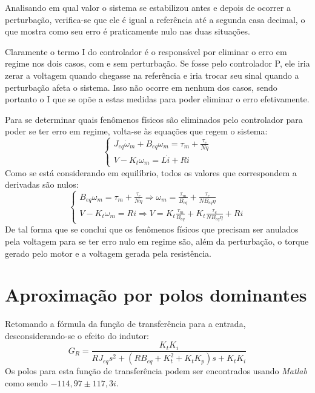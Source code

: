 \documentclass{article}[twocolumn]
\begin{document}
	Analisando em qual valor o sistema se estabilizou antes e depois de ocorrer a
	perturba\c{c}\~ao, verifica-se que ele \'e igual a refer\^encia at\'e a segunda casa
	decimal, o que mostra como seu erro \'e praticamente nulo nas duas situa\c{c}\~oes.

	Claramente o termo I do controlador \'e o respons\'avel por eliminar o erro em regime
	nos dois casos, com e sem perturba\c{c}\~ao. Se fosse pelo controlador P, ele iria zerar
	a voltagem quando chegasse na refer\^encia e iria trocar seu sinal quando a perturba\c{c}\~ao
	afeta o sistema. Isso n\~ao ocorre em nenhum dos casos, sendo portanto o I que se op\~oe
	a estas medidas para poder eliminar o erro efetivamente.

	Para se determinar quais fen\^omenos f\'isicos s\~ao eliminados pelo controlador para
	poder se ter erro em regime, volta-se \`as equa\c{c}\~oes que regem o sistema:
	\begin{equation}
		\left\{\begin{array}{l}
			J_{eq}\dot{\omega}_m + B_{eq}\omega_m = \tau_m + \frac{\tau_e}{N\eta}\\
			V - K_t\omega_m = L\dot{i} + Ri
		\end{array}\right.
		\nonumber
	\end{equation}
	Como se est\'a considerando em equil\'ibrio, todos os valores que correspondem a derivadas
	s\~ao nulos:
	\begin{equation}
		\left\{\begin{array}{l}
			B_{eq}\omega_m = \tau_m + \frac{\tau_e}{N\eta} \Rightarrow \omega_m =
			\frac{\tau_m}{B_{eq}} + \frac{\tau_e}{NB_{eq}\eta}\\
			V - K_t\omega_m = Ri \Rightarrow V =
			K_t\frac{\tau_m}{B_{eq}} + K_t\frac{\tau_e}{NB_{eq}\eta} + Ri
		\end{array}\right.
		\nonumber
	\end{equation}
	De tal forma que se conclui que os fen\^omenos f\'isicos que precisam ser anulados pela
	voltagem para se ter erro nulo em regime s\~ao, al\'em da perturba\c{c}\~ao, o torque
	gerado pelo motor e a voltagem gerada pela resist\^encia.
	\section{Aproxima\c{c}\~ao por polos dominantes}
	Retomando a f\'ormula da fun\c{c}\~ao de transfer\^encia para a entrada, desconsiderando-se
	o efeito do indutor:
	\begin{equation}
		G_R = \frac{K_tK_i}
		{RJ_{eq}s^2 + (RB_{eq} + K_t^2 + K_tK_p)s + K_tK_i}
		\nonumber
	\end{equation}
	Os polos para esta fun\c{c}\~ao de transfer\^encia podem ser encontrados usando
	\textit{Matlab} como sendo $-114,97 \pm 117,3i$.
\end{document}
